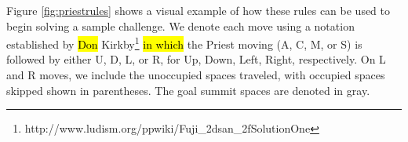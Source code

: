 \documentclass[journal]{IEEEtran}
\begin{document}
Figure \ref{fig:priestrules} shows a visual example of how these rules can be used to begin solving a sample challenge. We denote each move using a notation established by \hl{Don} Kirkby\footnote{http://www.ludism.org/ppwiki/Fuji\_2dsan\_2fSolutionOne} \hl{in which} the Priest moving (A, C, M, or S) is followed by either U, D, L, or R, for Up, Down, Left, Right, respectively. On L and R moves, we include the unoccupied spaces traveled, with occupied spaces skipped shown in parentheses. The goal summit spaces are denoted in gray. 




\end{document}
